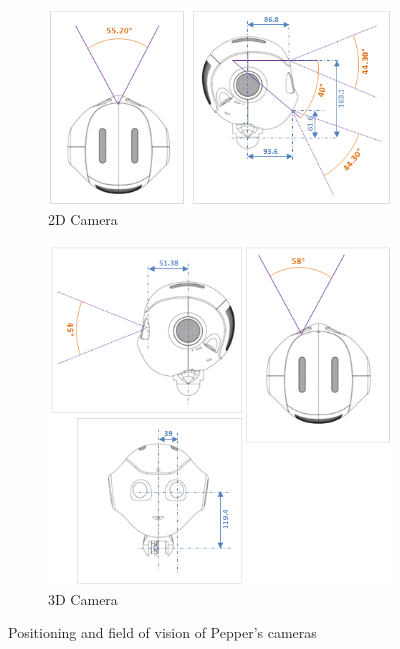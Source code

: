 \begin{figure}[H]
\centering
\begin{subfigure}{.5\textwidth}
  \centering
  \includegraphics[width=\linewidth]{Figures/Pepper_Robot/2d_camera.png}
  \caption{2D Camera}
  \label{fig:2d_camera}
\end{subfigure}%
\begin{subfigure}{.5\textwidth}
  \centering
  \includegraphics[width=\linewidth]{Figures/Pepper_Robot/3d_camera.png}
  \caption{3D Camera}
  \label{fig:3d_camera}
\end{subfigure}
\caption{Positioning and field of vision of Pepper's cameras}
\label{fig:cameras}
\end{figure}

